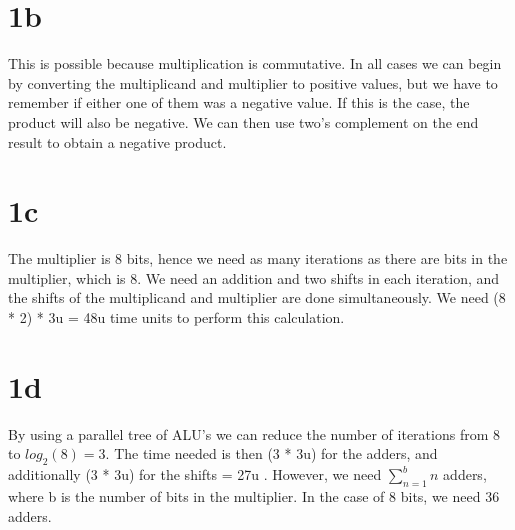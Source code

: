\documentclass[10pt,a4paper]{article}
\begin{document}
	\section*{1b}
	This is possible because multiplication is commutative. In all cases we can begin by converting the multiplicand and multiplier to positive values, but we have to remember if either one of them was a negative value. If this is the case, the product will also be negative. We can then use two's complement on the end result to
	obtain a negative product.
	\section*{1c}
	The multiplier is 8 bits, hence we need as many iterations as there are bits in the multiplier, which is 8. We need an addition and two shifts in each iteration, and the shifts of the multiplicand and multiplier are done simultaneously. We need (8 * 2) * 3u  = 48u time units to perform this calculation.
	\section*{1d}
	By using a parallel tree of ALU's we can reduce the number of iterations from 8 to $log_{2}(8) = 3$. The time needed is then (3 *  3u) for the adders, and additionally (3 * 3u) for the shifts = 27u . However, we need $\sum_{n=1}^{b} n$ adders, where b is the number of bits in the multiplier. In the case of 8 bits, we need 36 adders.
	
	
\end{document}
